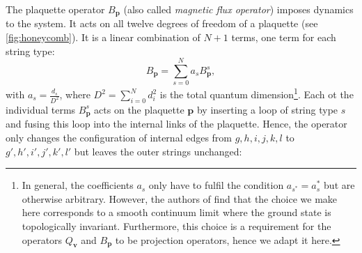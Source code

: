 The plaquette operator $B_\mathbf{p}$ (also called \emph{magnetic flux operator}) imposes dynamics to the system. It acts on all twelve degrees of freedom of a plaquette (see \cref{fig:honeycomb}). It is a linear combination of $N+1$ terms, one term for each string type:
	\begin{equation}
		B_\mathbf{p}=\sum_{s=0}^N a_s B_\mathbf{p}^s,
	\end{equation}
with $a_s=\frac{d_s}{D^2}$, where $D^2=\sum_{i=0}^N d_i^2$ is the total quantum dimension\footnote{In general, the coefficients $a_s$ only have to fulfil the condition $a_{s^*}=a_s^*$ but are otherwise arbitrary. However, the authors of \cite{Levin2005} find that the choice we make here corresponds to a smooth continuum limit where the ground state is topologically invariant. Furthermore, this choice is a requirement for the operators $Q_\mathbf{v}$ and $B_\mathbf{p}$ to be projection operators, hence we adapt it here.}. Each ot the individual terms $B_\mathbf{p}^s$ acts on the plaquette $\mathbf{p}$ by inserting a loop of string type $s$ and fusing this loop into the internal links of the plaquette. Hence, the operator only changes the configuration of internal edges from $g,h,i,j,k,l$ to $g',h',i',j',k',l'$ but leaves the outer strings unchanged: 
